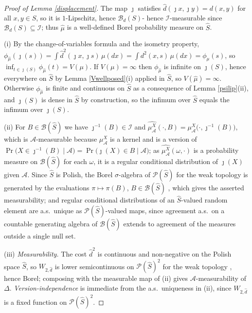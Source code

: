 \documentclass{article}
\newcommand{\I}{\mathcal{I}}
\newcommand{\1}{\mathbbm{1}}
\begin{document}
\begin{proof}[Proof of Lemma \ref{displacement}]
The map $\jmath$ satisfies $\hat d(\jmath x,\jmath y)=d(x,y)$ for all $x,y\in S$, so it is
$1$-Lipschitz, hence $\mathcal{B}_d(S)$- hence $\I$-measurable since $\mathcal{B}_d(S)\subseteq\I$; thus $\hat\mu$ is
a well-defined Borel probability measure on $\hat S$.

(i) By the change-of-variables formula and the isometry property,
$\phi_{\hat\mu}(\jmath(s))=\int\hat d^2(\jmath x,\jmath s)\,\mu(dx)=\int d^2(x,s)\,\mu(dx)
=\phi_\mu(s)$, so $\inf_{t\in\jmath(S)}\phi_{\hat\mu}(t)=V(\mu)$. If $V(\mu)=\infty$ then
$\phi_{\hat\mu}$ is infinite on $\jmath(S)$, hence everywhere on $\hat S$ by Lemma
\ref{Vwellposed}(i) applied in $\hat S$, so $V(\hat\mu)=\infty$. Otherwise $\phi_{\hat\mu}$ is
finite and continuous on $\hat S$ as a consequence of Lemma \ref{psilip}(ii), and $\jmath(S)$ is dense in $\hat S$ by
construction, so the infimum over $\hat S$ equals the infimum over $\jmath(S)$.

(ii) For $B\in\mathcal{B}(\hat S)$ we have $\jmath^{-1}(B)\in\I$ and
$\widehat{\mu^X_\mathcal{A}}(\cdot,B)=\mu^X_\mathcal{A}\big(\cdot,\jmath^{-1}(B)\big)$, which is
$\mathcal{A}$-measurable because $\mu^X_\mathcal{A}$ is a kernel and is a version of
$\Pr\big(X\in\jmath^{-1}(B)\mid\mathcal{A}\big)=\Pr\big(\jmath(X)\in B\mid\mathcal{A}\big)$; as
$\widehat{\mu^X_\mathcal{A}}(\omega,\cdot)$ is a probability measure on $\mathcal{B}(\hat S)$ for each
$\omega$, it is a regular conditional distribution of $\jmath(X)$ given $\mathcal{A}$. Since
$\hat S$ is Polish, the Borel $\sigma$-algebra of $\mathcal{P}(\hat S)$ for the weak topology is
generated by the evaluations $\pi\mapsto\pi(B)$, $B\in\mathcal{B}(\hat S)$
\citep[Ch.~II]{Parthasarathy1967}, which gives the asserted measurability; and regular conditional
distributions of an $\hat S$-valued random element are a.s.\ unique as $\mathcal{P}(\hat
S)$-valued maps, since agreement a.s.\ on a countable generating algebra of $\mathcal{B}(\hat S)$ extends to
agreement of the measures outside a single null set.

(iii) \emph{Measurability.} The cost $\hat d^2$ is continuous and non-negative on the Polish space
$\hat S$, so $W_{2,\hat d}$ is lower semicontinuous on $\mathcal{P}(\hat S)^2$ for the weak topology
\citep[Ch.~6]{Villani2009}, hence Borel; composing with the measurable map of (ii) gives
$\mathcal{A}$-measurability of $\Delta$. \emph{Version-independence} is immediate from the a.s.\
uniqueness in (ii), since $W_{2,\hat d}$ is a fixed function on $\mathcal{P}(\hat S)^2$.


\end{proof}
\end{document}
